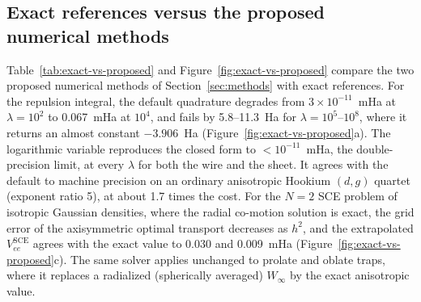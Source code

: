 \documentclass[journal=jctcce,manuscript=article]{achemso}
\begin{document}
\subsection{Exact references versus the proposed numerical methods}
\label{sec:exact-vs-proposed}
Table~\ref{tab:exact-vs-proposed} and Figure~\ref{fig:exact-vs-proposed}
compare the two proposed numerical methods of Section~\ref{sec:methods} with
exact references.  For the repulsion integral, the default quadrature degrades
from $3\times10^{-11}$~mHa at $\lambda=10^2$ to 0.067~mHa at $10^4$, and fails
by 5.8--11.3~Ha for $\lambda=10^5$--$10^8$, where it returns an almost
constant $-3.906$~Ha (Figure~\ref{fig:exact-vs-proposed}a).  The logarithmic
variable reproduces the closed form to $<10^{-11}$~mHa, the double-precision
limit, at every $\lambda$ for both the wire and the sheet.  It agrees with the
default to machine precision on an ordinary anisotropic Hookium $(d,g)$
quartet (exponent ratio 5), at about 1.7 times the cost.  For the $N=2$ SCE
problem of isotropic Gaussian densities, where the radial co-motion solution
is exact, the grid error of the axisymmetric optimal transport decreases as
$h^2$, and the extrapolated $V_{ee}^{\mathrm{SCE}}$ agrees with the exact
value to 0.030 and 0.009~mHa (Figure~\ref{fig:exact-vs-proposed}c).  The same
solver applies unchanged to prolate and oblate traps, where it replaces a
radialized (spherically averaged) $W_\infty$ by the exact anisotropic value.
\end{document}
